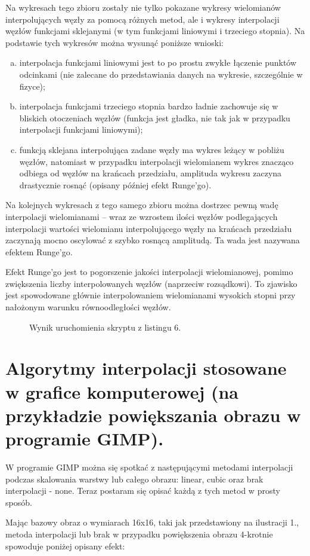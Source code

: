 \documentclass[a4paper,oneside,11pt]{report}
\begin{document}
Na wykresach tego zbioru zostały nie tylko pokazane wykresy wielomianów interpolujących węzły za pomocą różnych metod, ale i wykresy interpolacji węzłów funkcjami sklejanymi (w tym funkcjami liniowymi i trzeciego stopnia). Na podstawie tych wykresów można wysunąć poniższe wnioski:
\begin{enumerate}[a)]
\item interpolacja funkcjami liniowymi jest to po prostu zwykłe łączenie punktów odcinkami (nie zalecane do przedstawiania danych na wykresie, szczególnie w fizyce);
\item interpolacja funkcjami trzeciego stopnia bardzo ładnie zachowuje się w bliskich otoczeniach węzłów (funkcja jest gładka, nie tak jak w przypadku interpolacji funkcjami liniowymi);
\item funkcją sklejana interpolująca zadane węzły ma wykres leżący w pobliżu węzłów, natomiast w przypadku interpolacji wielomianem wykres znacząco odbiega od węzłów na krańcach przedziału, amplituda wykresu zaczyna drastycznie rosnąć (opisany później efekt Runge'go).
\end{enumerate}
Na kolejnych wykresach z tego samego zbioru można dostrzec pewną wadę interpolacji wielomianami – wraz ze wzrostem ilości węzłów podlegających interpolacji wartości wielomianu interpolującego węzły na krańcach przedziału zaczynają mocno oscylować z szybko rosnącą amplitudą. Ta wada jest nazywana efektem Runge'go.

Efekt Runge’go jest to pogorszenie jakości interpolacji wielomianowej, pomimo zwiększenia liczby interpolowanych węzłów (naprzeciw rozsądkowi). To zjawisko jest spowodowane głównie interpolowaniem wielomianami wysokich stopni przy nałożonym warunku równoodległości węzłów.
\begin{figure}[htp] 
\caption{Wynik uruchomienia skryptu z listingu 6.}
\end{figure}
\newpage
\section{Algorytmy interpolacji stosowane w grafice komputerowej (na
przykładzie powiększania obrazu w programie GIMP).}
W programie GIMP można się spotkać z następującymi metodami interpolacji podczas skalowania warstwy lub całego obrazu: linear, cubic oraz brak interpolacji - none. Teraz postaram się opisać każdą z tych metod w prosty sposób.

Mając bazowy obraz o wymiarach 16x16, taki jak przedstawiony na ilustracji 1., metoda interpolacji lub brak w przypadku powiększenia obrazu 4-krotnie spowoduje poniżej opisany efekt:
\end{document}
